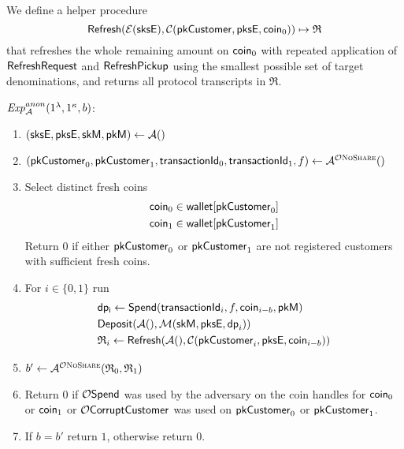We define a helper procedure
\begin{equation*}
  \mathsf{Refresh}(\mathcal{E}(\mathsf{sksE}), \mathcal{C}(\mathsf{pkCustomer}, \mathsf{pksE}, \mathsf{coin}_0)) \mapsto \mathfrak{R}
\end{equation*}
that refreshes the whole remaining amount on $\mathsf{coin}_0$ with repeated application of $\mathsf{RefreshRequest}$
and $\mathsf{RefreshPickup}$ using the smallest possible set of target denominations, and returns all protocol transcripts
in $\mathfrak{R}$.

\begin{mdframed}
\small
\noindent $\mathit{Exp}_{\mathcal{A}}^{anon}(1^\lambda, 1^\kappa, b)$:
\vspace{-0.5\topsep}
\begin{enumerate}
  \setlength\itemsep{0em}
  \item $(\mathsf{sksE}, \mathsf{pksE}, \mathsf{skM}, \mathsf{pkM}) \leftarrow {\ensuremath{\mathcal{A}}}()$
  \item $(\mathsf{pkCustomer}_0, \mathsf{pkCustomer}_1, \mathsf{transactionId}_0, \mathsf{transactionId}_1, f) \leftarrow {\ensuremath{\mathcal{A}}}^{\mathcal{O}\textsc{NoShare}}()$
  \item Select distinct fresh coins
    \begin{align*}
      \mathsf{coin}_0 &\in \mathsf{wallet}[\mathsf{pkCustomer}_0]\\
      \mathsf{coin}_1 &\in \mathsf{wallet}[\mathsf{pkCustomer}_1]
    \end{align*}
    Return $0$ if either $\mathsf{pkCustomer}_0$ or $\mathsf{pkCustomer}_1$ are not registered customers with sufficient fresh coins.
  \item  For $i \in \{0,1\}$ run
      \begin{align*}
        &\mathsf{dp_i} \leftarrow \mathsf{Spend}(\mathsf{transactionId}_i, f, \mathsf{coin}_{i-b}, \mathsf{pkM}) \\
        &\mathsf{Deposit}(\mathcal{A}(), \mathcal{M}(\mathsf{skM}, \mathsf{pksE}, \mathsf{dp}_i)) \\
        &\mathfrak{R}_i \leftarrow \mathsf{Refresh}(\mathcal{A}(), \mathcal{C}(\mathsf{pkCustomer}_i, \mathsf{pksE}, \mathsf{coin}_{i-b}))
      \end{align*}
  \item $b' \leftarrow {\cal A}^{\mathcal{O}\textsc{NoShare}}(\mathfrak{R}_0, \mathfrak{R}_1)$ \\
  \item Return $0$ if $\mathcal{O}\mathsf{Spend}$ was used by the adversary on the coin handles
    for $\mathsf{coin}_0$ or $\mathsf{coin}_1$ or $\mathcal{O}\mathsf{CorruptCustomer}$ was used on $\mathsf{pkCustomer}_0$ or $\mathsf{pkCustomer}_1$.
  \item If $b = b'$ return $1$, otherwise return $0$.
\end{enumerate}
\end{mdframed}

